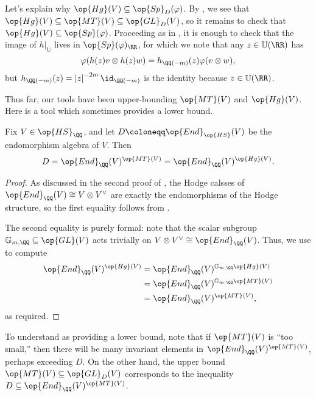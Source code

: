 \documentclass[../thesis.tex]{subfiles}
\begin{document}
\begin{remark} \label{rem:hg-commutes-polarization}
	Let's explain why $\op{Hg}(V)\subseteq\op{Sp}_D(\varphi)$. By , we see that $\op{Hg}(V)\subseteq\op{MT}(V)\subseteq\op{GL}_D(V)$, so it remains to check that $\op{Hg}(V)\subseteq\op{Sp}(\varphi)$. Proceeding as in , it is enough to check that the image of $h|_{\mathbb U}$ lives in $\op{Sp}(\varphi)_\RR$, for which we note that any $z\in\mathbb U(\RR)$ has
	\[\varphi(h(z)v\otimes h(z)w)=h_{\QQ(-m)}(z)\varphi(v\otimes w),\]
	but $h_{\QQ(-m)}(z)=\left|z\right|^{-2m}{\id_{\QQ(-m)}}$ is the identity because $z\in\mathbb U(\RR)$.
\end{remark}
Thus far, our tools have been upper-bounding $\op{MT}(V)$ and $\op{Hg}(V)$. Here is a tool which sometimes provides a lower bound.
\begin{lemma} \label{lem:mt-hg-fixes-endos}
	Fix $V\in\op{HS}_\QQ$, and let $D\coloneqq\op{End}_{\op{HS}}(V)$ be the endomorphism algebra of $V$. Then
	\[D=\op{End}_\QQ(V)^{\op{MT}(V)}=\op{End}_\QQ(V)^{\op{Hg}(V)}.\]
\end{lemma}
\begin{proof}
	As discussed in the second proof of , the Hodge calsses of $\op{End}_\QQ(V)\cong V\otimes V^\lor$ are exactly the endomorphisms of the Hodge structure, so the first equality follows from .

	The second equality is purely formal: note that the scalar subgroup $\mathbb G_{m,\QQ}\subseteq\op{GL}(V)$ acts trivially on $V\otimes V^\lor\cong\op{End}_\QQ(V)$. Thus, we use  to compute
	\begin{align*}
		\op{End}_\QQ(V)^{\op{Hg}(V)} &= \op{End}_\QQ(V)^{\mathbb G_{m,\QQ}\op{Hg}(V)} \\
		&= \op{End}_\QQ(V)^{\mathbb G_{m,\QQ}\op{MT}(V)} \\
		&= \op{End}_\QQ(V)^{\op{MT}(V)},
	\end{align*}
	as required.
\end{proof}
\begin{remark}
	To understand  as providing a lower bound, note that if $\op{MT}(V)$ is ``too small,'' then there will be many invariant elements in $\op{End}_\QQ(V)^{\op{MT}(V)}$, perhaps exceeding $D$. On the other hand, the upper bound $\op{MT}(V)\subseteq\op{GL}_D(V)$ corresponds to the inequality $D\subseteq\op{End}_\QQ(V)^{\op{MT}(V)}$.
\end{remark}
\end{document}
